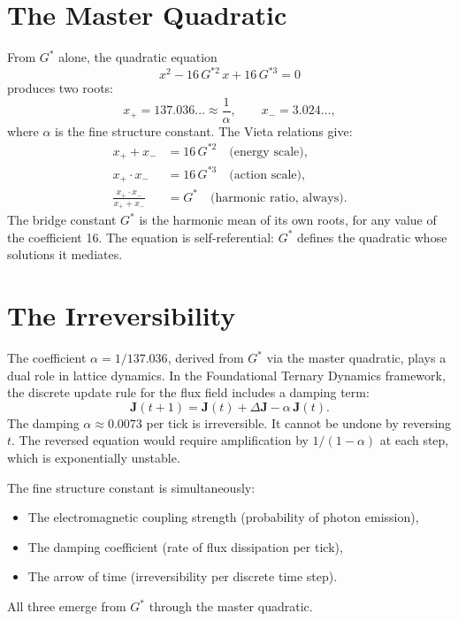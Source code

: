 \documentclass[12pt,letterpaper]{article}
\begin{document}
\section{The Master Quadratic}

From $G^*$ alone, the quadratic equation
\begin{equation}
x^2 - 16\,G^{*2}\,x + 16\,G^{*3} = 0
\label{eq:master}
\end{equation}
produces two roots:
\begin{equation}
x_+ = 137.036\ldots \approx \frac{1}{\alpha}, \qquad x_- = 3.024\ldots,
\end{equation}
where $\alpha$ is the fine structure constant. The Vieta relations give:
\begin{align}
x_+ + x_- &= 16\,G^{*2} \quad \text{(energy scale)}, \\
x_+ \cdot x_- &= 16\,G^{*3} \quad \text{(action scale)}, \\
\frac{x_+ \cdot x_-}{x_+ + x_-} &= G^* \quad \text{(harmonic ratio, always)}.
\end{align}
The bridge constant $G^*$ is the harmonic mean of its own roots, for any value of the coefficient 16. The equation is self-referential: $G^*$ defines the quadratic whose solutions it mediates.

\section{The Irreversibility}

The coefficient $\alpha = 1/137.036$, derived from $G^*$ via the master quadratic, plays a dual role in lattice dynamics. In the Foundational Ternary Dynamics framework, the discrete update rule for the flux field includes a damping term:
\begin{equation}
\mathbf{J}(t+1) = \mathbf{J}(t) + \Delta\mathbf{J} - \alpha\,\mathbf{J}(t).
\end{equation}
The damping $\alpha \approx 0.0073$ per tick is irreversible. It cannot be undone by reversing $t$. The reversed equation would require amplification by $1/(1-\alpha)$ at each step, which is exponentially unstable.

The fine structure constant is simultaneously:
\begin{itemize}
\item The electromagnetic coupling strength (probability of photon emission),
\item The damping coefficient (rate of flux dissipation per tick),
\item The arrow of time (irreversibility per discrete time step).
\end{itemize}
All three emerge from $G^*$ through the master quadratic.
\end{document}
